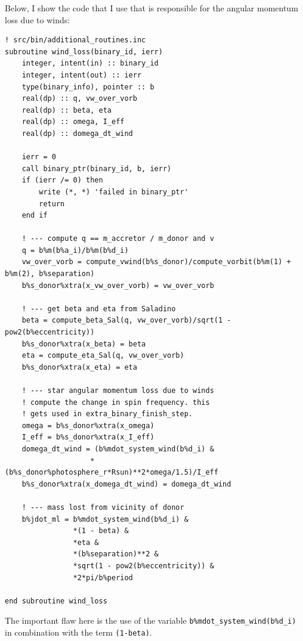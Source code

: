 \documentclass[a4paper,10pt]{article}
\begin{document}
Below, I show the code that I use that is responsible for the angular momentum loss due to winds:
\begin{verbatim}
! src/bin/additional_routines.inc
subroutine wind_loss(binary_id, ierr)
    integer, intent(in) :: binary_id
    integer, intent(out) :: ierr
    type(binary_info), pointer :: b
    real(dp) :: q, vw_over_vorb
    real(dp) :: beta, eta
    real(dp) :: omega, I_eff
    real(dp) :: domega_dt_wind

    ierr = 0
    call binary_ptr(binary_id, b, ierr)
    if (ierr /= 0) then
        write (*, *) 'failed in binary_ptr'
        return
    end if

    ! --- compute q == m_accretor / m_donor and v
    q = b%m(b%a_i)/b%m(b%d_i)
    vw_over_vorb = compute_vwind(b%s_donor)/compute_vorbit(b%m(1) + b%m(2), b%separation)
    b%s_donor%xtra(x_vw_over_vorb) = vw_over_vorb

    ! --- get beta and eta from Saladino
    beta = compute_beta_Sal(q, vw_over_vorb)/sqrt(1 - pow2(b%eccentricity))
    b%s_donor%xtra(x_beta) = beta
    eta = compute_eta_Sal(q, vw_over_vorb)
    b%s_donor%xtra(x_eta) = eta

    ! --- star angular momentum loss due to winds
    ! compute the change in spin frequency. this
    ! gets used in extra_binary_finish_step.
    omega = b%s_donor%xtra(x_omega)
    I_eff = b%s_donor%xtra(x_I_eff)
    domega_dt_wind = (b%mdot_system_wind(b%d_i) & 
                    *(b%s_donor%photosphere_r*Rsun)**2*omega/1.5)/I_eff
    b%s_donor%xtra(x_domega_dt_wind) = domega_dt_wind

    ! --- mass lost from vicinity of donor
    b%jdot_ml = b%mdot_system_wind(b%d_i) &
                *(1 - beta) &
                *eta &
                *(b%separation)**2 &
                *sqrt(1 - pow2(b%eccentricity)) &
                *2*pi/b%period

end subroutine wind_loss
\end{verbatim}

The important flaw here is the use of the variable \lstinline[style=output, breaklines=true]|b%mdot_system_wind(b%d_i)| in combination with the term \lstinline[style=output, breaklines=true]|(1-beta)|.
\end{document}
